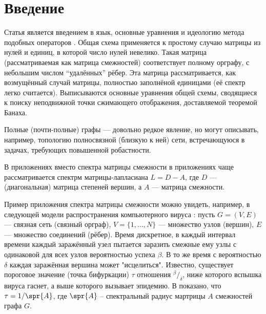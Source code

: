 \section{Введение}

Статья является введением в язык, основные уравнения и идеологию
метода подобных операторов \cite{baskakov-harmonic}.
Общая схема применяется к простому случаю матрицы из нулей и единиц,
в которой число нулей невелико.
Такая матрица (рассматриваемая как матрица смежностей)
соответствует полному орграфу, с небольшим числом ``удалённых'' рёбер.
Эта матрица рассматривается, как возмущённый случай матрицы,
полностью заполнёной единицами (её спектр легко считается).
Выписываются основные уравнения общей схемы,
сводящиеся к поиску неподвижной точки сжимающего отображения,
доставляемой теоремой Банаха.

Полные (почти-полные) графы --- довольно редкое явление,
но могут описывать, например, топологию полносвязной (близкую к ней) сети,
встречающуюся в задачах, требующих повышенной робастности.

В приложениях вместо спектра матрицы смежности в приложениях чаще рассматривается
спектрм матрицы-лапласиана \( L = D - A \),
где \( D \) --- (диагональная) матрица степеней вершин,
а \( A \) --- матрица смежности.

Пример приложения спектра матрицы смежности можно увидеть, например,
в следующей модели распространения компьютерного вируса \cite{epidemic-eigenvalues}:
пусть \( G = (V, E) \) --- связная сеть (связный орграф),
\( V = \{1, \ldots, N\} \) --- множество узлов (вершин),
\( E \) --- множество соединений (рёбер).
Время дискретное, в каждый интервал времени каждый заражённый узел
пытается заразить смежные ему узлы с одинаковой для всех узлов вероятностью успеха \( \beta \).
В то же время с вероятностью \( \delta \) каждая заражённая вершина может "исцелиться".
Известно, существует пороговое значение (точка бифуркации) \( \tau \) отношения \( {^\beta}/_{\delta} \),
ниже которого вспышка вируса гаснет, а выше которого вызывает эпидемию.
В \cite{epidemic-eigenvalues} показано, что \( \tau = 1/\spr{A} \),
где \( \spr{A} \) -- спектральный радиус мартрицы \( A \) смежностей графа \( G \).

